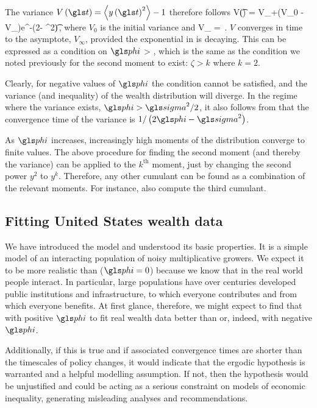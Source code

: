 The variance $V\left(\t\right)=\ave{y\left(\t\right)^2}-1$ therefore follows
\be
V\left(\t\right) = V_{\infty}+\left(V_0 - V_{\infty}\right)e^{-\left(2\gphi - \gsigma^2\right)\t}\,,
\ee
where $V_0$ is the initial variance and
\be
V_{\infty} = \,.
\ee
$V$ converges in time to the asymptote, $V_{\infty}$, provided the exponential in  is decaying. 
This can be expressed as a condition on $\gphi$
\be
\gphi > ,
\ee
which is the same as the condition we noted previously for the second moment to exist: $\zeta>k$ where $k=2$.

Clearly, for negative values of $\gphi$ the condition cannot be satisfied, and the variance (and inequality) of the wealth distribution will diverge. In the regime where the variance exists, $\gphi > \gsigma^2/2$, it also follows from  that the convergence time of the variance is $1/\left(2\gphi - \gsigma^2\right)$.

As $\gphi$ increases, increasingly high moments of the distribution converge to finite values. The above procedure for finding the second moment (and thereby the variance) can be applied to the $k^\text{th}$ moment, just by changing the second power $y^2$ to $y^k$. Therefore, any other cumulant can be found as a combination of the relevant moments. For instance, \cite{LiuSerota2017} also compute the third cumulant.


\subsection{Fitting United States wealth data}
We have introduced the \RGBM model and understood its basic properties. It is a simple model of an interacting population of noisy multiplicative growers. We expect it to be more realistic than \GBM ($\gphi=0$) because we know that in the real world people interact. In particular, large populations have over centuries developed public institutions and infrastructure, to which everyone contributes and from which everyone benefits. At first glance, therefore, we might expect to find that \RGBM with positive $\gphi$ to fit real wealth data better than \GBM or, indeed, \RGBM with negative $\gphi$.

Additionally, if this is true and if associated convergence times are shorter than the timescales of policy changes, it would indicate that the ergodic hypothesis is warranted and a helpful modelling assumption. If not, then the hypothesis would be unjustified and could be acting as a serious constraint on models of economic inequality, generating misleading analyses and recommendations.


